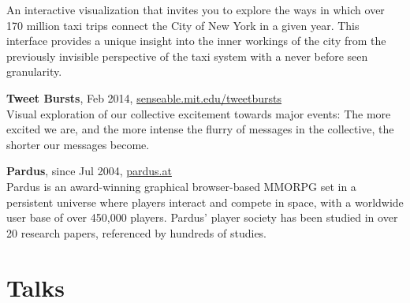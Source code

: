 \documentclass[10pt,a4paper]{article}
\renewenvironment{itemize}{
  \begin{list}{}{
    \setlength{\leftmargin}{1.5em}
    \setlength{\itemsep}{0.25em}
    \setlength{\parskip}{0pt}
    \setlength{\parsep}{0.25em}
  }
}{
  \end{list}
}
\begin{document}
\begin{itemize}
{An interactive visualization that invites you to explore the ways in which over 170 million taxi trips connect the City of New York in a given year. This interface provides a unique insight into the inner workings of the city from the previously invisible perspective of the taxi system with a never before seen granularity.}\\
\newpage
\item{\textbf{Tweet Bursts}, Feb 2014, \href{http://senseable.mit.edu/tweetbursts}{senseable.mit.edu/tweetbursts}\\[2pt]
Visual exploration of our collective excitement towards major events: The more excited we are, and the more intense the flurry of messages in the collective, the shorter our messages become.}\\
\item{\textbf{Pardus}, since Jul 2004}, \href{https://pardus.at}{pardus.at}\\[2pt]
Pardus is an award-winning graphical browser-based MMORPG set in a persistent universe where players interact and compete in space, with a worldwide user base of over 450,000 players. Pardus' player society has been studied in over 20 research papers, referenced by hundreds of studies.
\end{itemize}

\section*{Talks}
\end{document}
